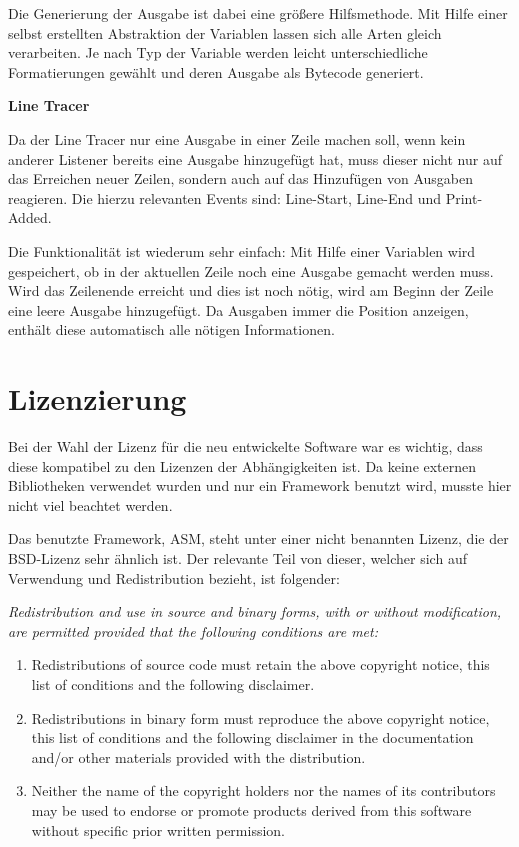 Die Generierung der Ausgabe ist dabei eine größere Hilfsmethode. Mit Hilfe einer selbst erstellten Abstraktion der Variablen lassen sich alle Arten gleich verarbeiten. Je nach Typ der Variable werden leicht unterschiedliche Formatierungen gewählt und deren Ausgabe als Bytecode generiert.

\textbf{Line Tracer}

Da der Line Tracer nur eine Ausgabe in einer Zeile machen soll, wenn kein anderer Listener bereits eine Ausgabe hinzugefügt hat, muss dieser nicht nur auf das Erreichen neuer Zeilen, sondern auch auf das Hinzufügen von Ausgaben reagieren. Die hierzu relevanten Events sind: Line-Start, Line-End und Print-Added.

Die Funktionalität ist wiederum sehr einfach: Mit Hilfe einer Variablen wird gespeichert, ob in der aktuellen Zeile noch eine Ausgabe gemacht werden muss. Wird das Zeilenende erreicht und dies ist noch nötig, wird am Beginn der Zeile eine leere Ausgabe hinzugefügt. Da Ausgaben immer die Position anzeigen, enthält diese automatisch alle nötigen Informationen.

\section{Lizenzierung} 

Bei der Wahl der Lizenz für die neu entwickelte Software war es wichtig, dass diese kompatibel zu den Lizenzen der Abhängigkeiten ist. Da keine externen Bibliotheken verwendet wurden und nur ein Framework benutzt wird, musste hier nicht viel beachtet werden.

Das benutzte Framework, ASM, steht unter einer nicht benannten Lizenz, die der BSD-Lizenz sehr ähnlich ist. Der relevante Teil von dieser, welcher sich auf Verwendung und Redistribution bezieht, ist folgender:

{\itshape
Redistribution and use in source and binary forms, with or without
modification, are permitted provided that the following conditions
are met:

\begin{enumerate}
	\item Redistributions of source code must retain the above copyright notice, this list of conditions and the following disclaimer.
	\item Redistributions in binary form must reproduce the above copyright notice, this list of conditions and the following disclaimer in the documentation and/or other materials provided with the distribution.
	\item Neither the name of the copyright holders nor the names of its contributors may be used to endorse or promote products derived from this software without specific prior written permission.
\end{enumerate}
}
\cite{asm_license}

